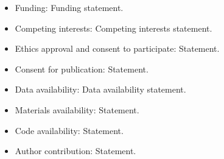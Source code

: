 \begin{itemize}
\item Funding: Funding statement.
\item Competing interests: Competing interests statement.
\item Ethics approval and consent to participate: Statement.
\item Consent for publication: Statement.
\item Data availability: Data availability statement.
\item Materials availability: Statement.
\item Code availability: Statement.
\item Author contribution: Statement.
\end{itemize}
